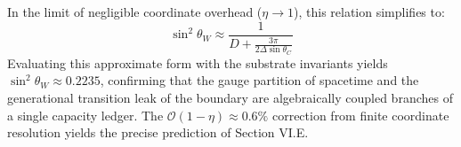 In the limit of negligible coordinate overhead ($\eta \to 1$), this relation simplifies to:
\begin{equation}
    \sin^2\theta_W \approx \frac{1}{D + \frac{3\pi}{2\Delta\sin\theta_C}}
\end{equation}
Evaluating this approximate form with the substrate invariants yields $\sin^2\theta_W \approx 0.2235$, confirming that the gauge partition of spacetime and the generational transition leak of the boundary are algebraically coupled branches of a single capacity ledger. The $\mathcal{O}(1-\eta) \approx 0.6\%$ correction from finite coordinate resolution yields the precise prediction of Section VI.E.